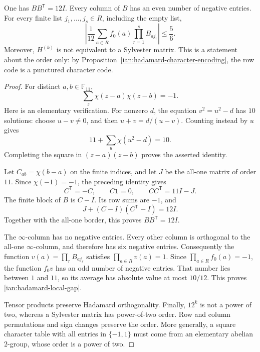 \begin{lemma}
\label{ian:hadamard-paley-local-gap}
One has \(BB^{\mathsf T}=12I\). Every column of \(B\) has an even number of negative entries. For every finite list \(j_1,\ldots,j_s\in R\), including the empty list,
\[
 \left|
 \frac1{12}\sum_{a\in R}
 f_0(a)\prod_{r=1}^sB_{a j_r}
 \right|
 \le\frac56.
 \tag{34.4}\label{ian:hadamard-local-gap}
\]
Moreover, \(H^{(k)}\) is not equivalent to a Sylvester matrix. This is a statement about the order only: by Proposition~\ref{ian:hadamard-character-encoding}, the row code is a punctured character code.
\end{lemma}
\begin{proof}
For distinct \(a,b\in\mathbb F_{11}\),
\[
 \sum_z\chi(z-a)\chi(z-b)=-1.
\]
Here is an elementary verification. For nonzero \(d\), the equation
\(v^2=u^2-d\) has \(10\) solutions: choose \(u-v\ne0\), and then \(u+v=d/(u-v)\). Counting instead by \(u\) gives
\[
 11+\sum_u\chi(u^2-d)=10.
\]
Completing the square in \((z-a)(z-b)\) proves the asserted identity.

Let \(C_{ab}=\chi(b-a)\) on the finite indices, and let \(J\) be the all-one matrix of order \(11\). Since \(\chi(-1)=-1\), the preceding identity gives
\[
 C^{\mathsf T}=-C,\qquad C\mathbf1=0,\qquad
 CC^{\mathsf T}=11I-J.
\]
The finite block of \(B\) is \(C-I\). Its row sums are \(-1\), and
\[
 J+(C-I)(C^{\mathsf T}-I)=12I.
\]
Together with the all-one border, this proves \(BB^{\mathsf T}=12I\).

The \(\infty\)-column has no negative entries. Every other column is orthogonal to the all-one \(\infty\)-column, and therefore has six negative entries. Consequently the function
\(v(a)=\prod_rB_{a j_r}\) satisfies \(\prod_{a\in R}v(a)=1\).
Since \(\prod_{a\in R}f_0(a)=-1\), the function \(f_0v\) has an odd number of negative entries. That number lies between \(1\) and \(11\), so its average has absolute value at most \(10/12\). This proves \eqref{ian:hadamard-local-gap}.

Tensor products preserve Hadamard orthogonality. Finally, \(12^k\) is not a power of two, whereas a Sylvester matrix has power-of-two order. Row and column permutations and sign changes preserve the order. More generally, a square character table with all entries in \(\{-1,1\}\) must come from an elementary abelian \(2\)-group, whose order is a power of two.
\end{proof}

